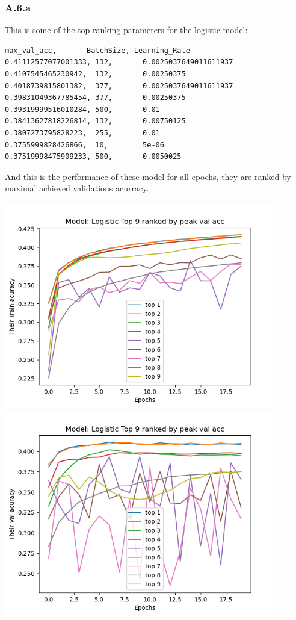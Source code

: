 \documentclass[]{article}
\begin{document}
    \subsubsection*{A.6.a}
        This is some of the top ranking parameters for the logistic model: 
        \begin{lstlisting}
max_val_acc,       BatchSize, Learning_Rate
0.41112577077001333, 132,       0.0025037649011611937
0.4107545465230942,  132,       0.00250375
0.4018739815801382,  377,       0.0025037649011611937
0.39831049367785454, 377,       0.00250375
0.39319999516010284, 500,       0.01
0.38413627818226814, 132,       0.00750125
0.3807273795828223,  255,       0.01
0.3755999828426866,  10,        5e-06
0.37519998475909233, 500,       0.0050025
        \end{lstlisting}
        And this is the performance of these model for all epochs, they are ranked by maximal achieved validations acurracy. 
        \\
        \begin{center}
            \includegraphics[width=12cm]{a6plots/20-37-33-May-22-2021-Logistic-train-acc.png}
            \includegraphics[width=12cm]{a6plots/20-37-33-May-22-2021-Logistic-val-acc.png}
        \end{center}
\end{document}
